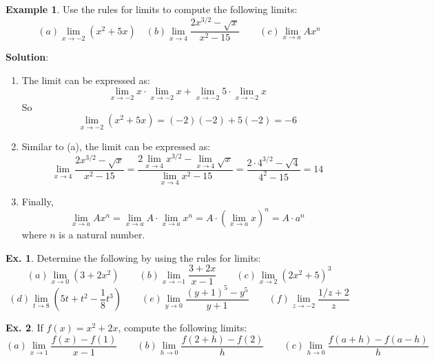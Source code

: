 \documentclass[10pt,a4paper]{book}
\theoremstyle{definition}\newtheorem{definition}{Definition}
\theoremstyle{definition}\newtheorem{fact}{Fact}
\theoremstyle{definition}\newtheorem{ex}{Ex.}
\theoremstyle{definition}\newtheorem{project}{Project}
\theoremstyle{definition}\newtheorem{problem}{Problem}
\theoremstyle{definition}\newtheorem{example}{Example}
\numberwithin{theorem}{chapter}
\numberwithin{corollary}{chapter}
\numberwithin{assumption}{chapter}
\numberwithin{definition}{chapter}
\numberwithin{prop}{chapter}
\numberwithin{notation}{chapter}
\numberwithin{problem}{chapter}
\numberwithin{example}{chapter}
\numberwithin{fact}{chapter}
\numberwithin{ex}{chapter}
\begin{document}
	\begin{example}
		Use the rules for limits to compute the following limits:
		\begin{equation*}
			(a) \lim_{x \rightarrow -2}(x^2+5x) \quad
			(b) \lim_{x \rightarrow 4} \frac{2x^{3/2}-\sqrt{x}}{x^2-15} \qquad
			(c) \lim_{x \rightarrow a} Ax^n
		\end{equation*}
		
		\textbf{Solution}:
		\begin{enumerate}[label=(\alph*)]
			\item The limit can be expressed as:
			$$\lim_{x \rightarrow -2}x \cdot \lim_{x \rightarrow -2}x + \lim_{x \rightarrow -2}5 \cdot \lim_{x \rightarrow -2}x$$
			So
			$$\lim_{x \rightarrow -2}(x^2+5x) = (-2)(-2)+5(-2) = -6$$
			\item Similar to (a), the limit can be expressed as:
			$$\lim_{x \rightarrow 4}\frac{2x^{3/2}-\sqrt{x}}{x^2-15}=\frac{2 \lim_{x \rightarrow 4} x^{3/2} - \lim_{x \rightarrow 4}\sqrt{x}}{\lim_{x \rightarrow 4} x^2 - 15} = \frac{2 \cdot 4^{3/2}-\sqrt{4}}{4^2-15}=14$$
			\item Finally,
			$$\lim_{x \rightarrow a}Ax^n = \lim_{x \rightarrow a}A \cdot \lim_{x \rightarrow a}x^n = A \cdot (\lim_{x \rightarrow a}x)^n = A \cdot a^n$$
			where $n$ is a natural number.
		\end{enumerate}
	\end{example}
	
	\begin{ex}
		Determine the following by using the rules for limits:
		\begin{equation*}
			(a) \lim_{x \rightarrow 0}(3+2x^2) \qquad
			(b) \lim_{x \rightarrow -1} \frac{3+2x}{x-1} \qquad
			(c) \lim_{x \rightarrow 2} (2x^2+5)^3
		\end{equation*}
		\begin{equation*}
			(d) \lim_{t \rightarrow 8}(5t+t^2-\frac{1}{8}t^3) \qquad
			(e) \lim_{y \rightarrow 0} \frac{(y+1)^5-y^5}{y+1} \qquad
			(f) \lim_{z \rightarrow -2} \frac{1/z+2}{z}
		\end{equation*}
	\end{ex}
	
	\begin{ex}
		If $f(x) = x^2+2x$, compute the following limits:
		\begin{equation*}
			(a) \lim_{x \rightarrow 1}\frac{f(x)-f(1)}{x-1} \qquad
			(b) \lim_{h \rightarrow 0} \frac{f(2+h)-f(2)}{h} \qquad
			(c) \lim_{h \rightarrow 0} \frac{f(a+h)-f(a-h)}{h}
		\end{equation*}
	\end{ex}
	
\end{document}
